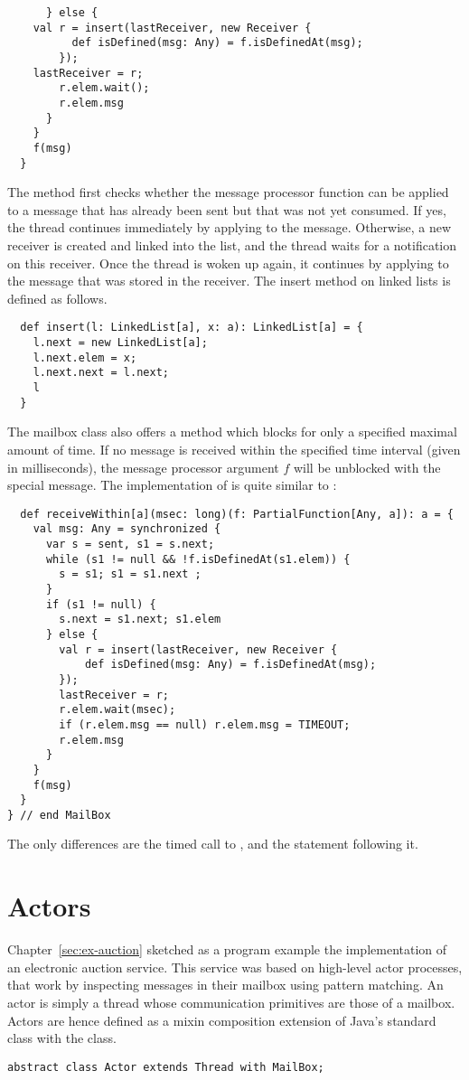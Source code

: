 \documentclass[a4paper,12pt,twoside,titlepage]{book}
\begin{document}
{\begin{lstlisting}
      } else {
	val r = insert(lastReceiver, new Receiver {
          def isDefined(msg: Any) = f.isDefinedAt(msg);
        });
	lastReceiver = r;
        r.elem.wait();
        r.elem.msg
      }
    }
    f(msg)
  }
\end{lstlisting}
The  method first checks whether the message processor function
 can be applied to a message that has already been sent but that
was not yet consumed. If yes, the thread continues immediately by
applying  to the message. Otherwise, a new receiver is created
and linked into the  list, and the thread waits for a
notification on this receiver. Once the thread is woken up again, it
continues by applying  to the message that was stored in the
receiver. The insert method on linked lists is defined as follows.
\begin{lstlisting}
  def insert(l: LinkedList[a], x: a): LinkedList[a] = {
    l.next = new LinkedList[a];
    l.next.elem = x;
    l.next.next = l.next;
    l
  }
\end{lstlisting}
The mailbox class also offers a method 
which blocks for only a specified maximal amount of time.  If no
message is received within the specified time interval (given in
milliseconds), the message processor argument $f$ will be unblocked
with the special  message.  The implementation of
 is quite similar to :
\begin{lstlisting}
  def receiveWithin[a](msec: long)(f: PartialFunction[Any, a]): a = {
    val msg: Any = synchronized {
      var s = sent, s1 = s.next;
      while (s1 != null && !f.isDefinedAt(s1.elem)) {
        s = s1; s1 = s1.next ;
      }
      if (s1 != null) {
        s.next = s1.next; s1.elem
      } else {
        val r = insert(lastReceiver, new Receiver {
            def isDefined(msg: Any) = f.isDefinedAt(msg);
        });
        lastReceiver = r;
        r.elem.wait(msec);
        if (r.elem.msg == null) r.elem.msg = TIMEOUT;
        r.elem.msg
      }
    }
    f(msg)
  }
} // end MailBox
\end{lstlisting}
The only differences are the timed call to , and the
statement following it.

\section{Actors}
\label{sec:actors}

Chapter~\ref{sec:ex-auction} sketched as a program example the
implementation of an electronic auction service. This service was
based on high-level actor processes, that work by inspecting messages
in their mailbox using pattern matching. An actor is simply a thread
whose communication primitives are those of a mailbox.  Actors are
hence defined as a mixin composition extension of Java's standard
 class with the  class.
\begin{lstlisting}
abstract class Actor extends Thread with MailBox;
\end{lstlisting}

}
\end{document}

